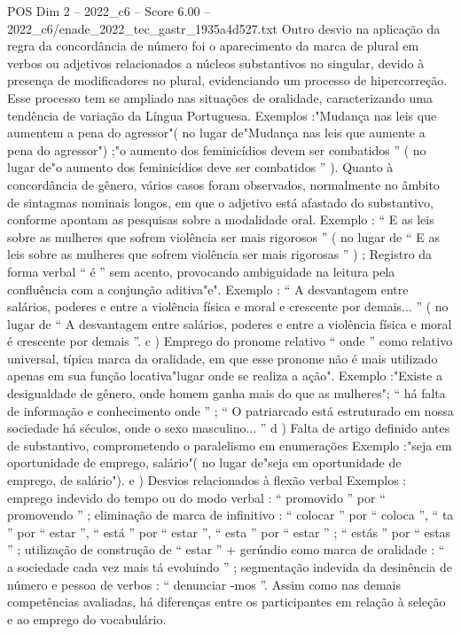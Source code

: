 \begin{textsample}{POS Dim 2 – 2022\_c6 – Score 6.00 – 2022\_c6/enade\_2022\_tec\_gastr\_1935a4d527.txt}
Outro desvio na aplicação da regra da concordância de número foi o aparecimento da marca de plural em verbos ou adjetivos relacionados a núcleos substantivos no singular, devido à presença de modificadores no plural, evidenciando um processo de hipercorreção.
Esse processo tem se ampliado nas situações de oralidade, caracterizando uma tendência de variação da Língua Portuguesa.
Exemplos :"Mudança nas leis que aumentem a pena do agressor"( no lugar de"Mudança nas leis que aumente a pena do agressor") ;"o aumento dos feminicídios devem ser combatidos ” ( no lugar de"o aumento dos feminicídios deve ser combatidos ” ).
Quanto à concordância de gênero, vários casos foram observados, normalmente no âmbito de sintagmas nominais longos, em que o adjetivo está afastado do substantivo, conforme apontam as pesquisas sobre a modalidade oral.
Exemplo : “ E as leis sobre as mulheres que sofrem violência ser mais rigorosos ” ( no lugar de “ E as leis sobre as mulheres que sofrem violência ser mais rigorosas ” ) ; Registro da forma verbal “ é ” sem acento, provocando ambiguidade na leitura pela confluência com a conjunção aditiva"e".
Exemplo : “ A desvantagem entre salários, poderes e entre a violência física e moral e crescente por demais... ” ( no lugar de “ A desvantagem entre salários, poderes e entre a violência física e moral é crescente por demais ”. c ) Emprego do pronome relativo “ onde ” como relativo universal, típica marca da oralidade, em que esse pronome não é mais utilizado apenas em sua função locativa"lugar onde se realiza a ação".
Exemplo :"Existe a desigualdade de gênero, onde homem ganha mais do que as mulheres"; “ há falta de informação e conhecimento onde ” ; “ O patriarcado está estruturado em nossa sociedade há séculos, onde o sexo masculino... ” d ) Falta de artigo definido antes de substantivo, comprometendo o paralelismo em enumerações Exemplo :"seja em oportunidade de emprego, salário"( no lugar de"seja em oportunidade de emprego, de salário"). e ) Desvios relacionados à flexão verbal Exemplos : emprego indevido do tempo ou do modo verbal : “ promovido ” por “ promovendo ” ; eliminação de marca de infinitivo : “ colocar ” por “ coloca ”, “ ta ” por “ estar ”, “ está ” por “ estar ”, “ esta ” por “ estar ” ; “ estás ” por “ estas ” ; utilização de construção de “ estar ” + gerúndio como marca de oralidade : “ a sociedade cada vez mais tá evoluindo ” ; segmentação indevida da desinência de número e pessoa de verbos : “ denunciar -mos ”.
Assim como nas demais competências avaliadas, há diferenças entre os participantes em relação à seleção e ao emprego do vocabulário.

\end{textsample}

